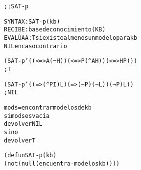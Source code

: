 \begin{aibox}{\function}
\begin{alltt}
;; SAT-p

SYNTAX: SAT-p (kb)
RECIBE   : base de conocimiento (KB)
EVALÚA A : T si existe al menos un modelo para kb
            NIL en caso contrario
\end{alltt}
\end{aibox}

\begin{aibox}{\examples}
\begin{alltt}
(SAT-p '((<=> A (¬ H)) (<=> P (^ A H)) (<=> H P))) 
; T

(SAT-p '((=> (^ P I) L) (=> (¬ P) (¬ L)) (¬ P) L)) 
; NIL
\end{alltt}

\end{aibox}

\begin{aibox}{\comments}

\end{aibox}
\begin{aibox}{\pseudocode}
\begin{alltt}
mods = encontrar modelos de kb
si mods es vacía
	devolver NIL
si no
	devolver T
\end{alltt}
\end{aibox}
\begin{aibox}{\code}

\begin{alltt}

(defun SAT-p (kb)
  (not (null (encuentra-modelos kb))))

\end{alltt}
\end{aibox}
